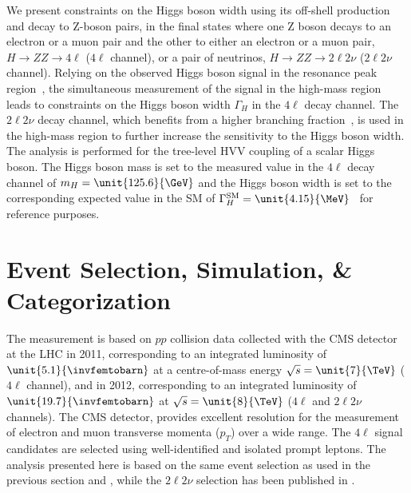 We present constraints on the Higgs boson width using its off-shell production and decay
to Z-boson pairs, in the final states where one Z boson decays to an electron or a muon pair and the
other to either an electron or a muon pair, $H \to ZZ \to 4\ell$ ($4\ell$ channel), or a pair
of neutrinos, $H \to ZZ \to 2\ell2\nu$ ($2\ell2\nu$ channel). Relying on the observed Higgs boson
signal in the resonance peak region~\cite{Chatrchyan:2013mxa}, the simultaneous measurement of the
signal in the high-mass region leads to constraints on the Higgs boson width $\Gamma_{H}$ in the $4\ell$ decay
channel. The $2\ell 2\nu$ decay channel, which benefits from a higher branching fraction~\cite{Chatrchyan:2013yoa,Chatrchyan:2012ft},
is used in the high-mass region to further increase the sensitivity to the Higgs boson width.
The analysis is performed for the tree-level HVV coupling of a scalar Higgs boson. The Higgs boson mass is set to the
measured value in the $4\ell$ decay channel of $m_H = \unit{125.6}{\GeV}$ \cite{Chatrchyan:2013mxa} and the
Higgs boson width is set to the corresponding expected value in the SM of
$\Gamma_{H}^{\textrm{SM}} = \unit{4.15}{\MeV}$~\cite{Dittmaier:2011ti,Heinemeyer:2013tqa} for reference purposes.

\section{Event Selection, Simulation, \& Categorization}
\label{sec:ZZ4l_ZZ2l2nu_Analysis}

The measurement is based on $pp$ collision data collected with the CMS detector at the LHC in 2011, corresponding to an integrated luminosity of $\unit{5.1}{\invfemtobarn}$ at a centre-of-mass energy $\sqrt{s} = \unit{7}{\TeV}$ ($4\ell$ channel), and in 2012, corresponding to an integrated luminosity of $\unit{19.7}{\invfemtobarn}$ at $\sqrt{s} = \unit{8}{\TeV}$ ($4\ell$ and $2\ell2\nu$ channels). The CMS detector, provides excellent resolution for the measurement of electron and muon transverse momenta ($p_{T}$) over a wide range. The $4\ell$ signal candidates are selected using well-identified and isolated prompt leptons. The analysis presented here is based on the same event selection as used in the previous section and \cite{Chatrchyan:2013mxa}, while the $2\ell2\nu$ selection has been published in \cite{Chatrchyan:2013yoa}.

